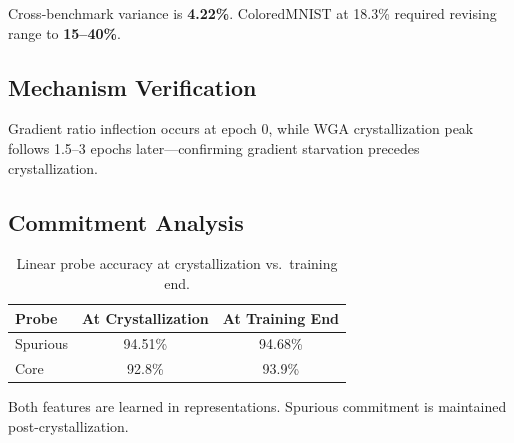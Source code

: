 Cross-benchmark variance is \textbf{4.22\%}. ColoredMNIST at 18.3\% required revising range to \textbf{15--40\%}.

\subsection{Mechanism Verification}

Gradient ratio inflection occurs at epoch 0, while WGA crystallization peak follows 1.5--3 epochs later---confirming gradient starvation precedes crystallization.

\subsection{Commitment Analysis}

\begin{table}[h]
\centering
\caption{Linear probe accuracy at crystallization vs.\ training end.}
\begin{tabular}{lcc}
\toprule
Probe & At Crystallization & At Training End \\
\midrule
Spurious & 94.51\% & 94.68\% \\
Core & 92.8\% & 93.9\% \\
\bottomrule
\end{tabular}
\label{tab:commitment}
\end{table}

Both features are learned in representations. Spurious commitment is maintained post-crystallization.
